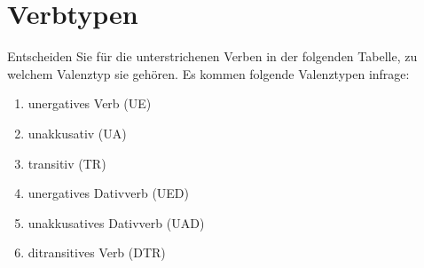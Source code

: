 \documentclass[12pt,a4paper,twoside]{article}
\newcommand{\Lf}{
  \setlength{\itemsep}{1pt}
  \setlength{\parskip}{0pt}
  \setlength{\parsep}{0pt}
}
\begin{document}
\vspace{-2\baselineskip}

\section{Verbtypen}

Entscheiden Sie für die unterstrichenen Verben in der folgenden Tabelle, zu welchem Valenztyp sie gehören.
Es kommen folgende Valenztypen infrage:

\begin{enumerate}\Lf
  \item unergatives Verb (UE)
  \item unakkusativ (UA)
  \item transitiv (TR)
  \item unergatives Dativverb (UED) %
  \item unakkusatives Dativverb (UAD) %
  \item ditransitives Verb (DTR) %
\end{enumerate}
\end{document}

